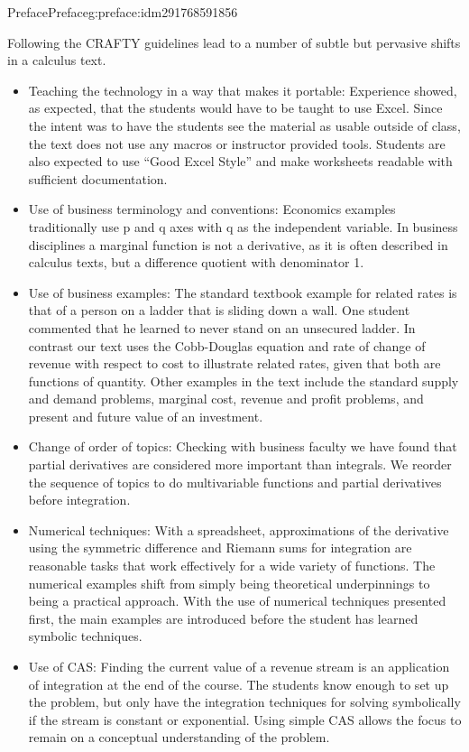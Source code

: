 \documentclass[oneside,10pt,]{book}
\numberwithin{equation}{section}
\begin{document}
\begin{preface}{Preface}{}{Preface}{}{}{g:preface:idm291768591856}
\begin{itemize}[label=\textbullet]
\end{itemize}
Following the CRAFTY guidelines lead to a number of subtle but pervasive shifts in a calculus text.%
%
\begin{itemize}[label=\textbullet]
\item{}Teaching the technology in a way that makes it portable: Experience showed, as expected, that the students would have to be taught to use Excel. Since the intent was to have the students see the material as usable outside of class, the text does not use any macros or instructor provided tools. Students are also expected to use “Good Excel Style” and make worksheets readable with sufficient documentation.%
\item{}Use of business terminology and conventions: Economics examples traditionally use p and q axes with q as the independent variable. In business disciplines a marginal function is not a derivative, as it is often described in calculus texts, but a difference quotient with denominator 1.%
\item{}Use of business examples: The standard textbook example for related rates is that of a person on a ladder that is sliding down a wall. One student commented that he learned to never stand on an unsecured ladder. In contrast our text uses the Cobb-Douglas equation and rate of change of revenue with respect to cost to illustrate related rates, given that both are functions of quantity. Other examples in the text include the standard supply and demand problems, marginal cost, revenue and profit problems, and present and future value of an investment.%
\item{}Change of order of topics: Checking with business faculty we have found that partial derivatives are considered more important than integrals. We reorder the sequence of topics to do multivariable functions and partial derivatives before integration.%
\item{}Numerical techniques: With a spreadsheet, approximations of the derivative using the symmetric difference and Riemann sums for integration are reasonable tasks that work effectively for a wide variety of functions. The numerical examples shift from simply being theoretical underpinnings to being a practical approach. With the use of numerical techniques presented first, the main examples are introduced before the student has learned symbolic techniques.%
\item{}Use of CAS: Finding the current value of a revenue stream is an application of integration at the end of the course. The students know enough to set up the problem, but only have the integration techniques for solving symbolically if the stream is constant or exponential. Using simple CAS allows the focus to remain on a conceptual understanding of the problem.%

\end{itemize}
\end{preface}
\end{document}
